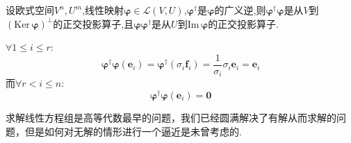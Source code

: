 \begin{green}
    \begin{lemma}[正交投影算子]\label{lem:正交投影算子}
        设欧式空间$V^n,U^m$,线性映射$\bm{\varphi}\in\mathcal{L}\left(V,U\right)$,$\bm{\varphi}^{\dagger}$是$\bm{\varphi}$的广义逆,则$\bm{\varphi}^{\dagger}\bm{\varphi}$是从$V$到$\left(
            \mathrm{Ker}\,\bm{\varphi}
        \right)^{\perp}$的正交投影算子,且$\bm{\varphi}\bm{\varphi}^{\dagger}$是从$U$到$\mathrm{Im}\,\bm{\varphi}$的正交投影算子.
    \end{lemma}
    \begin{Proof}
        $\forall1\leqslant i\leqslant r:$\[
        \bm{\varphi}^{\dagger}\bm{\varphi}\left(
            \bm{e}_i
        \right)=\bm{\varphi}^{\dagger}\left(
            \sigma_i\bm{f}_i
        \right)=\frac{1}{\sigma_i}\sigma_i\bm{e}_i=\bm{e}_i
        \]而$\forall r<i\leqslant n:$\[
        \bm{\varphi}^{\dagger}\bm{\varphi}\left(
            \bm{e}_i
            \right)=\bm{0}
            \]
    \end{Proof}
\end{green}
\begin{red}
    \begin{remark}
        求解线性方程组是高等代数最早的问题，我们已经圆满解决了有解从而求解的问题，但是如何对无解的情形进行一个逼近是未曾考虑的.
    \end{remark}
\end{red}
